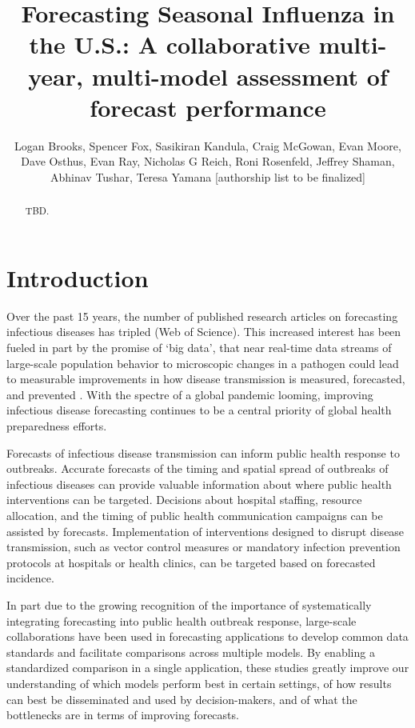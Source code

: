 \documentclass{article}\usepackage[]{graphicx}\usepackage[]{color}
\title{Forecasting Seasonal Influenza in the U.S.: A collaborative multi-year, multi-model assessment of forecast performance}
\author{Logan Brooks, Spencer Fox, Sasikiran Kandula, Craig McGowan, Evan Moore, \\Dave Osthus, Evan Ray, Nicholas G Reich, Roni Rosenfeld, Jeffrey Shaman, \\Abhinav Tushar, Teresa Yamana [authorship list to be finalized]}
\begin{document}
\maketitle

\begin{abstract}

TBD. 

\end{abstract}







\section{Introduction}

Over the past 15 years, the number of published research articles on forecasting infectious diseases has tripled (Web of Science). 
This increased interest has been fueled in part by the promise of `big data', that near real-time data streams of large-scale population behavior \cite{Molodecky2017} to microscopic changes in a pathogen \cite{Du2017} could lead to measurable improvements in how disease transmission is measured, forecasted, and prevented \cite{Bansal2016}. 
With the spectre of a global pandemic looming, improving infectious disease forecasting continues to be a central priority of global health preparedness efforts.\cite{Myers2000,WorldHealthOrganization2016,Chretien2015}

Forecasts of infectious disease transmission can inform public health response to outbreaks. 
Accurate forecasts of the timing and spatial spread of outbreaks of infectious diseases can provide valuable information about where public health interventions can be targeted.\cite{Lipsitch2011}
Decisions about hospital staffing, resource allocation, and the timing of public health communication campaigns can be assisted by forecasts. 
Implementation of interventions designed to disrupt disease transmission, such as vector control measures or mandatory infection prevention protocols at hospitals or health clinics, can be targeted based on forecasted incidence.

In part due to the growing recognition of the importance of systematically integrating forecasting into public health outbreak response, large-scale collaborations have been used in forecasting applications to develop common data standards and facilitate comparisons across multiple models.\cite{Biggerstaff2016,Smith2017,Biggerstaff2018,Viboud2017}
By enabling a standardized comparison in a single application, these studies greatly improve our understanding of which models perform best in certain settings, of how results can best be disseminated and used by decision-makers, and of what the bottlenecks are in terms of improving forecasts.
\end{document}
